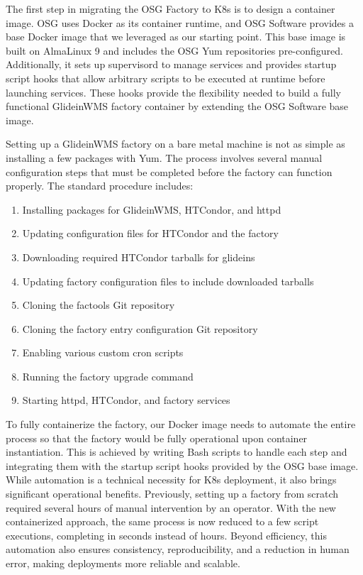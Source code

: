 \documentclass{webofc}
\begin{document}
The first step in migrating the OSG Factory to K8s is to design a container image. OSG uses Docker\cite{docker} as its container runtime, and OSG Software provides a base Docker image that we leveraged as our starting point. This base image is built on AlmaLinux 9 and includes the OSG Yum repositories pre-configured. Additionally, it sets up supervisord to manage services and provides startup script hooks that allow arbitrary scripts to be executed at runtime before launching services. These hooks provide the flexibility needed to build a fully functional GlideinWMS factory container by extending the OSG Software base image.

Setting up a GlideinWMS factory on a bare metal machine is not as simple as installing a few packages with Yum. The process involves several manual configuration steps that must be completed before the factory can function properly. The standard procedure includes:

\begin{enumerate}
\item Installing packages for GlideinWMS, HTCondor, and httpd
\item Updating configuration files for HTCondor and the factory
\item Downloading required HTCondor tarballs for glideins
\item Updating factory configuration files to include downloaded tarballs
\item Cloning the factools Git repository
\item Cloning the factory entry configuration Git repository
\item Enabling various custom cron scripts
\item Running the factory upgrade command
\item Starting httpd, HTCondor, and factory services
\end{enumerate}

To fully containerize the factory, our Docker image needs to automate the entire process so that the factory would be fully operational upon container instantiation. This is achieved by writing Bash scripts to handle each step and integrating them with the startup script hooks provided by the OSG base image. While automation is a technical necessity for K8s deployment, it also brings significant operational benefits. Previously, setting up a factory from scratch required several hours of manual intervention by an operator. With the new containerized approach, the same process is now reduced to a few script executions, completing in seconds instead of hours. Beyond efficiency, this automation also ensures consistency, reproducibility, and a reduction in human error, making deployments more reliable and scalable.
\end{document}
